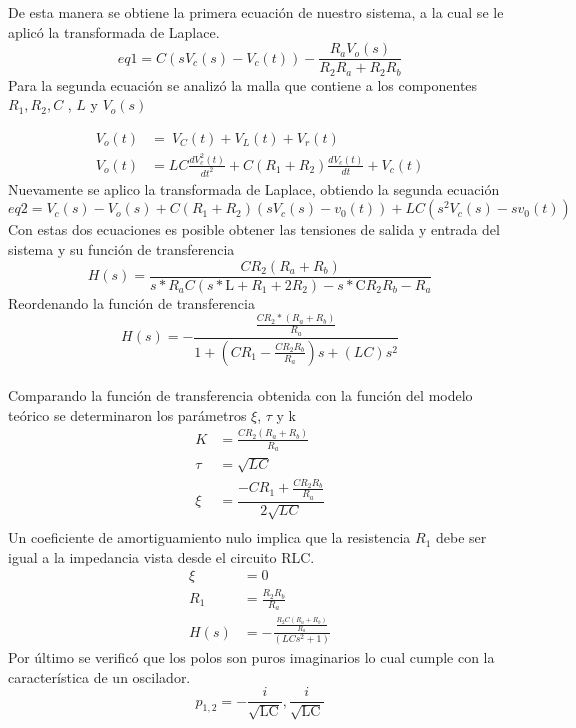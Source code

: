 \documentclass[10pt,a4paper]{article} %
\begin{document}
De esta manera se obtiene la primera ecuación de nuestro sistema, a la cual se le aplicó la transformada de Laplace. 
\begin{equation}
eq1=C(s V_{c}(s)-V_{c}(t))-\frac{R_{a} V_{o}(s)}{R_{2} R_{a} +R_{2} R_{b}}
\end{equation}
Para la segunda ecuación se analizó la malla que contiene a los componentes $R_{1},R_{2}, C$ , $L$ y $V_{o}(s)$ 

\begin{align*}
 V_{o}(t)&=\ V_{C}(t)+ V_{L}(t)+ V_{r}(t)\\
V_{o}(t)&=LC\frac{d V_{c}^{2}(t)}{dt^{2}}+ C(R_{1}+R_{2})\frac{d V_{c}(t)}{dt}+V_{c}(t)
\end{align*}
Nuevamente se aplico la transformada de Laplace, obtiendo la segunda ecuación
\begin{equation}
eq2 = V_{c}(s) - V_{o}(s) + C(R_{1} + R_{2})(sV_{c}(s) - v_{0}(t)) + 
LC(s^{2}V_{c}(s) - sv_{0}(t))
\end{equation}
Con estas dos ecuaciones es posible obtener las tensiones de salida y entrada del sistema y su función de transferencia 
\begin{equation*}
H(s)=\frac{C R_{2} (R_{a}+R_{b})}{s*R_{a}C (s*\text{L} +R_{1}+2 R_{2})-s*\text{C}R_{2} R_{b} -R_{a}}
\end{equation*}
Reordenando la función de transferencia
\begin{equation*}
H(s)=-\frac{\frac{CR_{2}*(R_{a}+R_{b})}{R_{a}}}{1+(CR_{1}-\frac{CR_{2}R_{b}}{R_{a}})s+(LC)s^{2}}
\end{equation*}
\\
Comparando la función de transferencia obtenida con la función del modelo teórico se determinaron los parámetros $\xi$, $\tau$ y k 
\begin{align*}
K&=\frac{CR_{2}(R_{a}+R_{b})}{R_{a}}\\
\tau&=\sqrt{LC}\\
\xi&=\dfrac{-CR_{1}+\frac{CR_{2}R_{b}}{R_{a}}}{2\sqrt{LC}}\\
\end{align*}
Un coeficiente de amortiguamiento nulo implica que la resistencia $R_{1}$ debe ser igual a la impedancia vista desde el circuito RLC.
\begin{align*}
\xi&=0\\
R_{1}&=\frac{R_{2}R_{b}}{R_{a}}\\
H(s)&=-\frac{\frac{R_{2}C (R_{a}+R_{b})}{R_{a}}}{\left(LCs^2+1\right)}
\end{align*}
Por último se verificó que los polos son puros imaginarios lo cual cumple con la característica de un oscilador.
 \begin{equation*}
p_{1,2}=-\frac{i}{\sqrt{\text{L}\text{C}}},\frac{i}{\sqrt{\text{L}\text{C}}}
\end{equation*}
\end{document}

